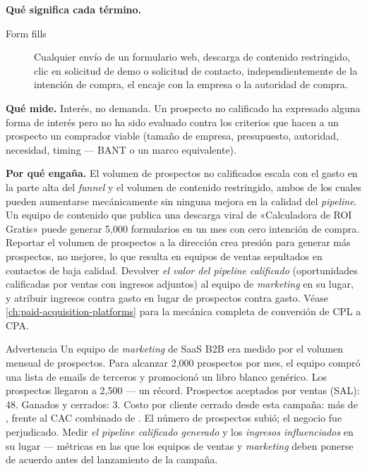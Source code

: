 \textbf{Qué significa cada término.}
\begin{description}
  \item[Form fills] Cualquier envío de un formulario web, descarga de contenido restringido,
    clic en solicitud de demo o solicitud de contacto, independientemente de la intención de
    compra, el encaje con la empresa o la autoridad de compra.
\end{description}

\textbf{Qué mide.} Interés, no demanda. Un prospecto no calificado ha expresado alguna forma
de interés pero no ha sido evaluado contra los criterios que hacen a un prospecto un comprador
viable (tamaño de empresa, presupuesto, autoridad, necesidad, timing --- BANT o un marco
equivalente).

\textbf{Por qué engaña.} El volumen de prospectos no calificados escala con el gasto en la
parte alta del \emph{funnel} y el volumen de contenido restringido, ambos de los cuales
pueden aumentarse mecánicamente sin ninguna mejora en la calidad del \emph{pipeline}. Un
equipo de contenido que publica una descarga viral de «Calculadora de ROI Gratis» puede
generar 5,000 formularios en un mes con cero intención de compra. Reportar el volumen de
prospectos a la dirección crea presión para generar más prospectos, no mejores, lo que
resulta en equipos de ventas sepultados en contactos de baja calidad. Devolver \emph{el
valor del pipeline calificado} (oportunidades calificadas por ventas con ingresos adjuntos)
al equipo de \emph{marketing} en su lugar, y atribuir ingresos contra gasto en lugar de
prospectos contra gasto. Véase \cref{ch:paid-acquisition-platforms} para la mecánica
completa de conversión de CPL a CPA.

\begin{admonition}{Advertencia}
Un equipo de \emph{marketing} de SaaS B2B era medido por el volumen mensual de prospectos.
Para alcanzar 2,000 prospectos por mes, el equipo compró una lista de emails de terceros y
promocionó un libro blanco genérico. Los prospectos llegaron a 2,500 --- un récord. Prospectos
aceptados por ventas (SAL): 48. Ganados y cerrados: 3. Costo por cliente cerrado desde esta
campaña: más de , frente al CAC combinado de . El número de
prospectos subió; el negocio fue perjudicado. Medir \emph{el pipeline calificado generado}
y los \emph{ingresos influenciados} en su lugar --- métricas en las que los equipos de ventas
y \emph{marketing} deben ponerse de acuerdo antes del lanzamiento de la campaña.
\end{admonition}


